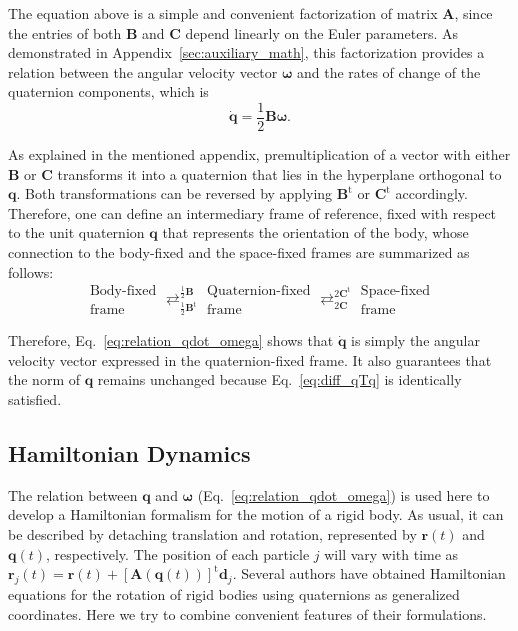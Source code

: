 \documentclass[aip,jcp,reprint,amsmath,amssymb]{revtex4-1}
\newcommand{\mt}[1]{\boldsymbol{\mathbf{#1}}}           %
\newcommand{\vt}[1]{\boldsymbol{\mathbf{#1}}}           %
\newcommand{\tr}[1]{#1^\text{t}}                               %
\begin{document}
The equation above is a simple and convenient factorization of matrix $\mt A$, since the entries of both $\mt B$ and $\mt C$ depend linearly on the Euler parameters. As demonstrated in Appendix~\ref{sec:auxiliary_math}, this factorization provides a relation between the angular velocity vector $\vt \omega$ and the rates of change of the quaternion components, which is
\begin{equation}
\label{eq:relation_qdot_omega}
\dot{\vt q} = \frac{1}{2} \mt B \vt \omega.
\end{equation}

As explained in the mentioned appendix, premultiplication of a vector with either $\mt B$ or $\mt C$ transforms it into a quaternion that lies in the hyperplane orthogonal to $\vt q$. Both transformations can be reversed by applying $\tr{\vt B}$ or $\tr{\vt C}$ accordingly. Therefore, one can define an intermediary frame of reference, fixed with respect to the unit quaternion $\vt q$ that represents the orientation of the body, whose connection to the body-fixed and the space-fixed frames are summarized as follows:
\[
\boxed{\substack{\text{Body-fixed} \\ \text{frame}}}
\mathrel{\mathop{\rightleftarrows}^{\frac{1}{2}\mt B}_{\frac{1}{2}\tr{\mt B}}}
\boxed{\substack{\text{Quaternion-fixed} \\ \text{frame}}}
\mathrel{\mathop{\rightleftarrows}^{2 \tr{\mt C}}_{2 \mt C}}
\boxed{\substack{\text{Space-fixed} \\ \text{frame}}}
\]

Therefore, Eq.~\ref{eq:relation_qdot_omega} shows that $\dot{\vt q}$ is simply the angular velocity vector expressed in the quaternion-fixed frame. It also guarantees that the norm of $\vt q$ remains unchanged because Eq.~\ref{eq:diff_qTq} is identically satisfied.

\subsection{Hamiltonian Dynamics}
\label{sec:hamiltonian}

The relation between $\vt q$ and $\vt \omega$ (Eq.~\ref{eq:relation_qdot_omega}) is used here to develop a Hamiltonian formalism for the motion of a rigid body. As usual, it can be described by detaching translation and rotation, represented by ${\vt r}(t)$ and ${\vt q}(t)$, respectively. The position of each particle $j$ will vary with time as $\vt r_j(t) = \vt r(t) + \tr{[{\mt A}(\vt q(t))]}\vt d_j$. Several authors have obtained Hamiltonian equations for the rotation of rigid bodies using quaternions as generalized coordinates.\cite{Maciejewski1985, Dichmann1996, Miller2002, Ravishankar2004, Nielsen2012} Here we try to combine convenient features of their formulations.
\end{document}
